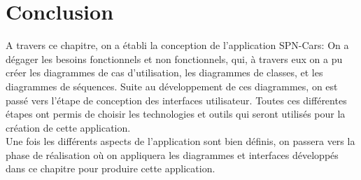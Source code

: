 \section*{Conclusion}
A travers ce chapitre, on a établi la conception de l'application SPN-Cars: On a dégager les besoins fonctionnels et non fonctionnels, qui, à travers eux on a pu créer les diagrammes de cas d'utilisation, les diagrammes de classes, et les diagrammes de séquences. Suite au développement de ces diagrammes, on est passé vers l'étape de conception des interfaces utilisateur. Toutes ces différentes étapes ont permis de choisir les technologies et outils qui seront utilisés pour la création de cette application.\\
Une fois les différents aspects de l'application sont bien définis, on passera vers la phase de réalisation où on appliquera les diagrammes et interfaces développés dans ce chapitre pour produire cette application.